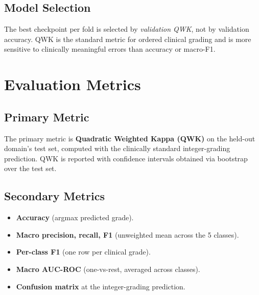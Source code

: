 \documentclass[11pt]{article}
\begin{document}
\subsection{Model Selection}
The best checkpoint per fold is selected by \emph{validation QWK}, not by validation accuracy. QWK is the standard metric for ordered clinical grading and is more sensitive to clinically meaningful errors than accuracy or macro-F1.

\section{Evaluation Metrics}

\subsection{Primary Metric}
The primary metric is \textbf{Quadratic Weighted Kappa (QWK)} on the held-out domain's test set, computed with the clinically standard integer-grading prediction. QWK is reported with confidence intervals obtained via bootstrap over the test set.

\subsection{Secondary Metrics}
\begin{itemize}[leftmargin=*, topsep=0pt]
  \item \textbf{Accuracy} (argmax predicted grade).
  \item \textbf{Macro precision, recall, F1} (unweighted mean across the 5 classes).
  \item \textbf{Per-class F1} (one row per clinical grade).
  \item \textbf{Macro AUC-ROC} (one-vs-rest, averaged across classes).
  \item \textbf{Confusion matrix} at the integer-grading prediction.
\end{itemize}
\end{document}
